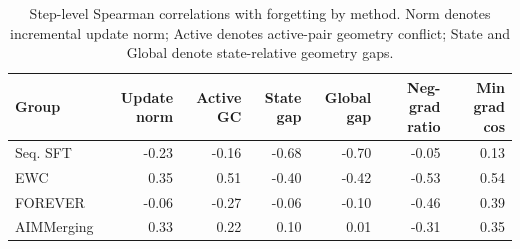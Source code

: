 \documentclass{article}
\begin{document}
\begin{table}[!htbp]
  \centering
  \caption{
  {Step-level Spearman correlations with forgetting by method.}
  Norm denotes incremental update norm; Active denotes active-pair geometry conflict; State and Global denote state-relative geometry gaps.
  }
  \label{tab:app_step_corr_method}
  \scriptsize
  \setlength{\tabcolsep}{4pt}
{
\renewcommand{\arraystretch}{1.08}
\begin{tabular}{lrrrrrr}
\toprule[0.9pt]
\rowcolor{sizeBand}
Group & Update norm & Active GC & State gap & Global gap & Neg-grad ratio & Min grad cos \\
\midrule
\rowcolor{refGray} Seq. SFT & -0.23 & -0.16 & -0.68 & -0.70 & -0.05 & 0.13 \\
\rowcolor{refGray} EWC & 0.35 & 0.51 & -0.40 & -0.42 & -0.53 & 0.54 \\
\rowcolor{refGray} FOREVER & -0.06 & -0.27 & -0.06 & -0.10 & -0.46 & 0.39 \\
\rowcolor{mergeBlue} AIMMerging & 0.33 & 0.22 & 0.10 & 0.01 & -0.31 & 0.35 \\
\bottomrule[0.9pt]
\end{tabular}
}

\end{table}
\end{document}
